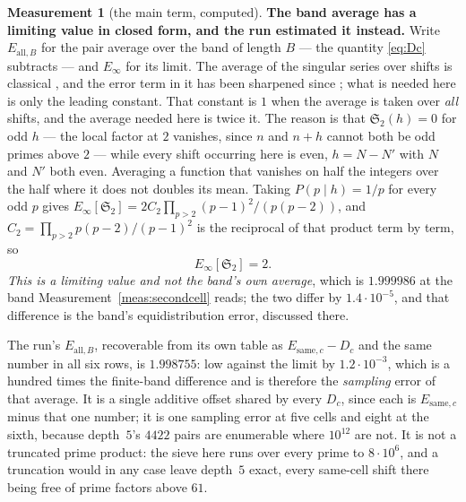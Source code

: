 \documentclass[11pt,a4paper]{article}
\theoremstyle{plain}
\theoremstyle{definition}
\newtheorem{measurement}[theorem]{Measurement}
\theoremstyle{remark}
\renewcommand{\SS}{\mathfrak{S}}
\begin{document}
\begin{measurement}[the main term, computed]
\textbf{The band average has a limiting value in closed form, and the
run estimated it instead.} Write $E_{\mathrm{all},B}$ for the pair
average over the band of length $B$ --- the quantity
\eqref{eq:Dc} subtracts --- and $E_\infty$ for its limit. The average
of the singular series over shifts is classical \cite{Gallagher}, and
the error term in it has been sharpened since \cite{Pintz}; what is
needed here is only the leading constant. That constant is $1$ when the
average is taken over \emph{all} shifts, and the average needed here is
twice it. The reason is that $\SS_2(h)=0$ for odd $h$ --- the local
factor at $2$ vanishes, since $n$ and $n+h$ cannot both be odd primes
above $2$ --- while every shift occurring here is even, $h=N-N'$ with
$N$ and $N'$ both even. Averaging a function that vanishes on half the
integers over the half where it does not doubles its mean. Taking
$P(p\mid h)=1/p$ for every odd $p$ gives
$E_\infty[\SS_2]=2C_2\prod_{p>2}(p-1)^2/(p(p-2))$, and
$C_2=\prod_{p>2}p(p-2)/(p-1)^2$ is the reciprocal of that product term
by term, so
\[
  E_\infty[\SS_2]=2 .
\]
\emph{This is a limiting value and not the band's own average}, which is
$1.999986$ at the band Measurement~\ref{meas:secondcell} reads; the two
differ by $1.4\cdot10^{-5}$, and that difference is the band's
equidistribution error, discussed there.

The run's $E_{\mathrm{all},B}$, recoverable from its own table as
$E_{\mathrm{same},c}-D_c$ and the same number in all six rows, is
$1.998755$: low against the limit by $1.2\cdot10^{-3}$, which is a
hundred times the finite-band difference and is therefore the
\emph{sampling} error of that average. It is a single additive offset
shared by every $D_c$, since each is $E_{\mathrm{same},c}$ minus that
one number; it is one sampling error at five cells and eight at the
sixth, because depth~$5$'s $4422$ pairs are enumerable where $10^{12}$
are not. It is not a truncated prime product: the sieve here runs over
every prime to $8\cdot10^6$, and a truncation would in any case leave
depth~$5$ exact, every same-cell shift there being free of prime
factors above $61$.


\end{measurement}
\end{document}

